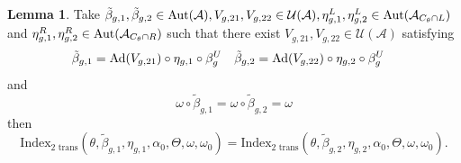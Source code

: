 \documentclass[12pt,a4paper,twoside]{article}
\let\originalleft\left
\let\originalright\right
\renewcommand{\left}{\mathopen{}\mathclose\bgroup\originalleft}
\renewcommand{\right}{\aftergroup\egroup\originalright}
\newcommand{\UU}{\mathcal U}
\renewcommand{\AA}{\mathcal A}
\newcommand{\Ad}[1]{\textrm{Ad}\left(#1\right)}
\newcommand{\Aut}[1]{\textrm{Aut}\left(#1\right)}
\theoremstyle{definition}
\newtheorem{lemma}[theorem]{Lemma}
\numberwithin{equation}{section}
\begin{document}
\begin{lemma}\label{lem:InvarianceUnderChoiceBetaTwoTranslations}
	Take $\tilde{\beta}_{g,1},\tilde{\beta}_{g,2}\in\Aut{\AA},V_{g,21},V_{g,22}\in\UU(\AA),\eta_{g,1}^L,\eta_{g,2}^L\in \Aut{\AA_{C_\theta\cap L}}$ and $\eta_{g,1}^R,\eta_{g,2}^R\in \Aut{\AA_{C_\theta\cap R}}$ such that there exist $V_{g,21},V_{g,22}\in\UU(\AA)$ satisfying
	\begin{align}\label{eq:InvarianceUnderChoiceBetaTwoBetasTwoTranslations}
		\tilde{\beta}_{g,1}&=\Ad{V_{g,21}}\circ\eta_{g,1}\circ\beta^U_g&\tilde{\beta}_{g,2}&=\Ad{V_{g,22}}\circ\eta_{g,2}\circ\beta^U_g
	\end{align}
	and
	\begin{equation}
		\omega\circ\tilde{\beta}_{g,1}=\omega\circ\tilde{\beta}_{g,2}=\omega
	\end{equation}
	then
	\begin{equation}
		\textrm{Index}_{\text{2 trans}}(\theta,\tilde{\beta}_{g,1},\eta_{g,1},\alpha_{0},\Theta,\omega,\omega_0)=\textrm{Index}_{\text{2 trans}}(\theta,\tilde{\beta}_{g,2},\eta_{g,2},\alpha_{0},\Theta,\omega,\omega_0).
	\end{equation}
\end{lemma}
\end{document}
